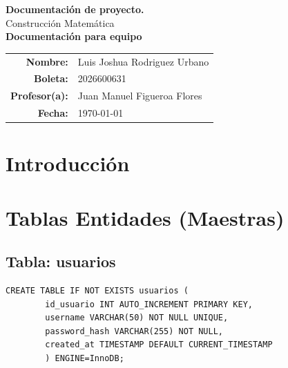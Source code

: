 \documentclass[11pt]{article}
\newcommand{\miTitulo}{Documentación para equipo}
\newcommand{\miNombre}{Luis Joshua Rodriguez Urbano}
\newcommand{\miBoleta}{2026600631}
\newcommand{\miMateria}{Construcción Matemática}
\newcommand{\miProfesor}{Juan Manuel Figueroa Flores}
\newcommand{\miActividad}{Documentación de proyecto. }
\newcommand{\miFecha}{\today}
\begin{document}
	
	\noindent
	\begin{minipage}[c]{0.55\textwidth}
		{\LARGE\bfseries\color{acento} \miActividad} \\[0.5em]
		{\large\color{grisclaro} \miMateria} \\[0.7em]
		{\Large\bfseries\color{tinta} \miTitulo}
	\end{minipage}%
	\hfill
	\begin{minipage}[c]{0.4\textwidth}
		\renewcommand{\arraystretch}{1.3}
		\begin{tabular}{r l}
			\bfseries\color{tinta} \small Nombre: & \small \miNombre \\
			\bfseries\color{tinta} \small Boleta: & \small \miBoleta \\
			\bfseries\color{tinta} \small Profesor(a): & \small \miProfesor \\
			\bfseries\color{tinta} \small Fecha: & \small \miFecha \\
		\end{tabular}
	\end{minipage}
	
	\vspace{0.6em}
	\noindent
	
	
	\vspace{1.5cm}
	
	
	\section{Introducción}
	\section{Tablas Entidades (Maestras)}
	
	\subsection{Tabla: usuarios}
	\begin{lstlisting}[style=sqlstyle]
		CREATE TABLE IF NOT EXISTS usuarios (
		id_usuario INT AUTO_INCREMENT PRIMARY KEY,
		username VARCHAR(50) NOT NULL UNIQUE,
		password_hash VARCHAR(255) NOT NULL,
		created_at TIMESTAMP DEFAULT CURRENT_TIMESTAMP
		) ENGINE=InnoDB;
	\end{lstlisting}
	
\end{document}

